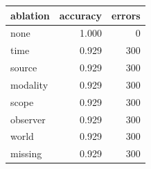 \begin{tabular}{lrr}
\toprule
ablation & accuracy & errors \\
\midrule
none & 1.000 & 0 \\
time & 0.929 & 300 \\
source & 0.929 & 300 \\
modality & 0.929 & 300 \\
scope & 0.929 & 300 \\
observer & 0.929 & 300 \\
world & 0.929 & 300 \\
missing & 0.929 & 300 \\
\bottomrule
\end{tabular}
